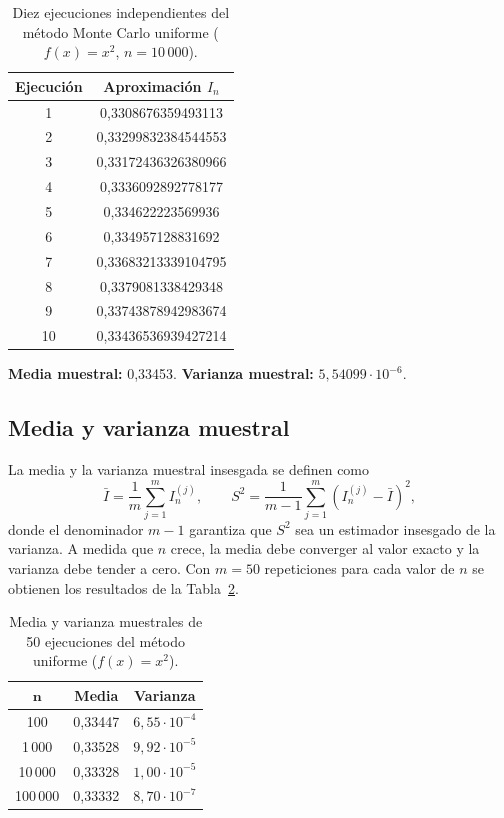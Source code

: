 \documentclass[11pt,a4paper]{article}
\newcommand{\cab}{\rowcolor{cabecera}}
\begin{document}
\begin{table}[H]
\centering
\caption{Diez ejecuciones independientes del método Monte Carlo uniforme ($f(x)=x^2$, $n = 10\,000$).}\label{tab:t2}
\begin{tabular}{cc}
\toprule
\cab \textbf{Ejecución} & \textbf{Aproximación $I_n$}\\
\midrule
1 & 0,3308676359493113\\
2 & 0,33299832384544553\\
3 & 0,33172436326380966\\
4 & 0,3336092892778177\\
5 & 0,334622223569936\\
6 & 0,334957128831692\\
7 & 0,33683213339104795\\
8 & 0,3379081338429348\\
9 & 0,33743878942983674\\
10 & 0,33436536939427214\\
\bottomrule
\end{tabular}
\end{table}

\begin{center}
\textbf{Media muestral:} 0,33453. \qquad \textbf{Varianza muestral:} $5{,}54099\cdot10^{-6}$.
\end{center}

\subsection{Media y varianza muestral}
La media y la varianza muestral insesgada se definen como
\begin{equation}
\bar I = \frac{1}{m}\sum_{j=1}^{m} I_n^{(j)}, \qquad S^2 = \frac{1}{m-1}\sum_{j=1}^{m}\left(I_n^{(j)}-\bar I\right)^2,
\end{equation}
donde el denominador $m-1$ garantiza que $S^2$ sea un estimador insesgado de la varianza. A medida que $n$ crece, la media debe converger al valor exacto y la varianza debe tender a cero. Con $m = 50$ repeticiones para cada valor de $n$ se obtienen los resultados de la Tabla~\ref{tab:t3}.

\begin{table}[H]
\centering
\caption{Media y varianza muestrales de 50 ejecuciones del método uniforme ($f(x)=x^2$).}\label{tab:t3}
\begin{tabular}{ccc}
\toprule
\cab $\boldsymbol{n}$ & \textbf{Media} & \textbf{Varianza}\\
\midrule
100 & 0,33447 & $6{,}55\cdot10^{-4}$\\
1\,000 & 0,33528 & $9{,}92\cdot10^{-5}$\\
10\,000 & 0,33328 & $1{,}00\cdot10^{-5}$\\
100\,000 & 0,33332 & $8{,}70\cdot10^{-7}$\\
\bottomrule
\end{tabular}
\end{table}
\end{document}
